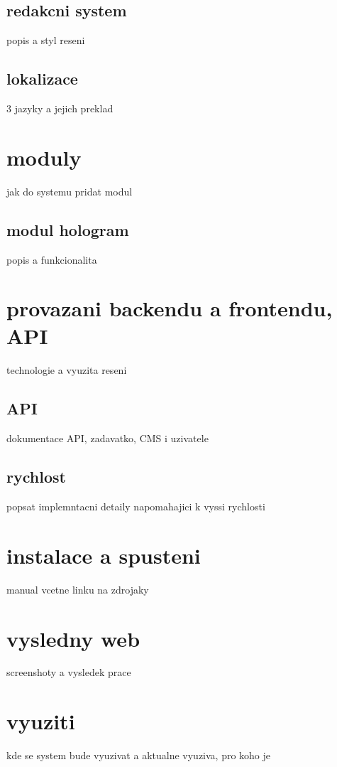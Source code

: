 \subsection{redakcni system}
popis a styl reseni
\subsection{lokalizace}
3 jazyky a jejich preklad

\section{moduly}
jak do systemu pridat modul
\subsection{modul hologram}
popis a funkcionalita

\section{provazani backendu a frontendu, API}
technologie a vyuzita reseni
\subsection{API}
dokumentace API, zadavatko, CMS i uzivatele
\subsection{rychlost}
popsat implemntacni detaily napomahajici k vyssi rychlosti

\section{instalace a spusteni}
manual vcetne linku na zdrojaky

\section{vysledny web}
screenshoty a vysledek prace

\section{vyuziti}
kde se system bude vyuzivat a aktualne vyuziva, pro koho je
